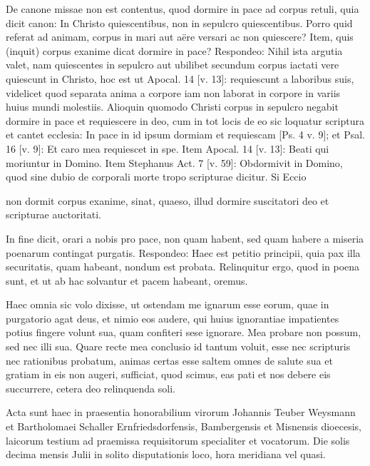 De canone missae non est contentus, quod dormire in pace ad corpus retuli, quia dicit canon: In Christo quiescentibus, non in sepulcro quiescentibus. Porro quid referat ad animam, corpus in mari aut aëre versari ac non quiescere? Item, quis (inquit) corpus exanime dicat dormire in pace? Respondeo: Nihil ista argutia valet, nam quiescentes in sepulcro aut ubilibet secundum corpus iactati vere quiescunt in Christo, hoc est ut Apocal. 14 [v. 13]: requiescunt a laboribus suis, videlicet quod separata anima a corpore iam non laborat in corpore in variis huius mundi molestiis. Alioquin quomodo Christi corpus in sepulcro negabit dormire in pace et requiescere in deo, cum in tot locis de eo sic loquatur scriptura et cantet ecclesia: In pace in id ipsum dormiam et requiescam [Ps. 4 v. 9]; et Psal. 16 [v. 9]: Et caro mea requiescet in spe. Item Apocal. 14 [v. 13]: Beati qui moriuntur in Domino. Item Stephanus Act. 7 [v. 59]: Obdormivit in Domino, quod sine dubio de corporali morte tropo scripturae dicitur. Si Eccio

non dormit corpus exanime, sinat, quaeso, illud dormire suscitatori deo et scripturae auctoritati.

In fine dicit, orari a nobis pro pace, non quam habent, sed quam habere a miseria poenarum contingat purgatis. Respondeo: Haec est petitio principii, quia pax illa securitatis, quam habeant, nondum est probata. Relinquitur ergo, quod in poena sunt, et ut ab hac solvantur et pacem habeant, oremus.

Haec omnia sic volo dixisse, ut ostendam me ignarum esse eorum, quae in purgatorio agat deus, et nimio eos audere, qui huius ignorantiae impatientes potius fingere volunt sua, quam confiteri sese ignorare. Mea probare non possum, sed nec illi sua. Quare recte mea conclusio id tantum voluit, esse nec scripturis nec rationibus probatum, animas certas esse saltem omnes de salute sua et gratiam in eis non augeri, sufficiat, quod scimus, eas pati et nos debere eis succurrere, cetera deo relinquenda soli.

Acta sunt haec in praesentia honorabilium virorum Johannis Teuber Weysmann et Bartholomaei Schaller Ernfriedsdorfensis, Bambergensis et Misnensis dioecesis, laicorum testium ad praemissa requisitorum specialiter et vocatorum. Die solis decima mensis Julii in solito disputationis loco, hora meridiana vel quasi.

